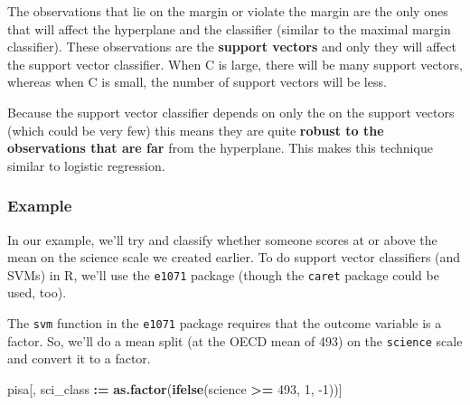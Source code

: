 \documentclass[]{book}
\newenvironment{Shaded}{\begin{snugshade}}{\end{snugshade}}
\newcommand{\CommentTok}[1]{\textcolor[rgb]{0.56,0.35,0.01}{\textit{#1}}}
\newcommand{\ControlFlowTok}[1]{\textcolor[rgb]{0.13,0.29,0.53}{\textbf{#1}}}
\newcommand{\DecValTok}[1]{\textcolor[rgb]{0.00,0.00,0.81}{#1}}
\newcommand{\ErrorTok}[1]{\textcolor[rgb]{0.64,0.00,0.00}{\textbf{#1}}}
\newcommand{\KeywordTok}[1]{\textcolor[rgb]{0.13,0.29,0.53}{\textbf{#1}}}
\newcommand{\NormalTok}[1]{#1}
\newcommand{\OperatorTok}[1]{\textcolor[rgb]{0.81,0.36,0.00}{\textbf{#1}}}
\newcommand{\StringTok}[1]{\textcolor[rgb]{0.31,0.60,0.02}{#1}}
\begin{document}
The observations that lie on the margin or violate the margin are the only ones that will affect the hyperplane and the classifier (similar to the maximal margin classifier). These observations are the \textbf{support vectors} and only they will affect the support vector classifier. When C is large, there will be many support vectors, whereas when C is small, the number of support vectors will be less.

Because the support vector classifier depends on only the on the support vectors (which could be very few) this means they are quite \textbf{robust to the observations that are far} from the hyperplane. This makes this technique similar to logistic regression.

\hypertarget{example}{%
\subsubsection{Example}\label{example}}

In our example, we'll try and classify whether someone scores at or above the mean on the science scale we created earlier. To do support vector classifiers (and SVMs) in R, we'll use the \texttt{e1071} package (though the \texttt{caret} package could be used, too).

\begin{Shaded}
\end{Shaded}

The \texttt{svm} function in the \texttt{e1071} package requires that the outcome variable is a factor. So, we'll do a mean split (at the OECD mean of 493) on the \texttt{science} scale and convert it to a factor.

\begin{Shaded}
\begin{Highlighting}[]
\NormalTok{pisa[, sci_class }\OperatorTok{:}\ErrorTok{=}\StringTok{ }\KeywordTok{as.factor}\NormalTok{(}\KeywordTok{ifelse}\NormalTok{(science }\OperatorTok{>=}\StringTok{ }\DecValTok{493}\NormalTok{, }\DecValTok{1}\NormalTok{, }\DecValTok{-1}\NormalTok{))]}
\end{Highlighting}
\end{Shaded}
\end{document}
